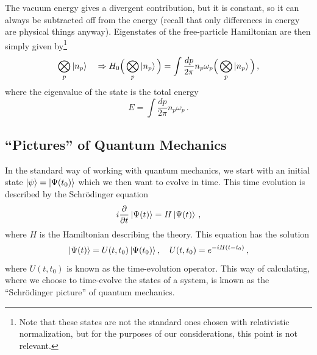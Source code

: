 \documentclass{article}
\numberwithin{equation}{subsection}
\begin{document}
The vacuum energy gives a divergent contribution, but it is constant, so it can always be subtracted off from the energy (recall that only differences in energy are 
physical things anyway). Eigenstates of the free-particle Hamiltonian are then simply given by\footnote{Note that these states are not the standard ones chosen 
with relativistic normalization, but for the purposes of our considerations, this point is not relevant.}
\begin{equation}
    \bigotimes_{p}\ket{n_p} \quad \Rightarrow H_0\Big(\bigotimes_p\ket{n_p}\Big) = \int\frac{dp}{2\pi} n_p\omega_p\Big(\bigotimes_p\ket{n_p}\Big)\,,
\end{equation}
where the eigenvalue of the state is the total energy
\begin{equation}
    E = \int\frac{dp}{2\pi}n_p\omega_p\,.
\end{equation}

\subsection{``Pictures'' of Quantum Mechanics}

In the standard way of working with quantum mechanics, we start with an initial state $\ket{\psi} = \ket{\Psi(t_0)}$
which we then want to evolve in time. 
This time evolution is described by the Schr\"{o}dinger equation
\begin{equation}
    i\frac{\partial}{\partial t}\ket{\Psi(t)} = H\ket{\Psi(t)}\,,
\end{equation}
where $H$ is the Hamiltonian describing the theory. This equation has the solution
\begin{equation}
    \ket{\Psi(t)} = U(t,t_0)\ket{\Psi(t_0)}, \quad U(t,t_0) = e^{-iH(t-t_0)}\,,
\end{equation}
where $U(t,t_0)$ is known as the time-evolution operator. This way of calculating, where we choose to time-evolve the states of a system, 
is known as the ``Schr\"{o}dinger picture'' of quantum mechanics.
\end{document}

